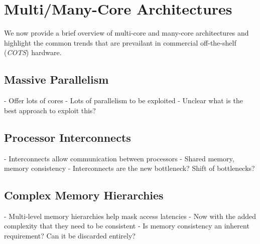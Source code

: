 \section{Multi/Many-Core Architectures}
\label{sec:overview}

We now provide a brief overview of multi-core and many-core architectures and
highlight the common trends that are prevailant in commercial off-the-shelf
(\emph{COTS}) hardware.

\subsection{Massive Parallelism}

- Offer lots of cores
- Lots of parallelism to be exploited
- Unclear what is the best approach to exploit this?

\subsection{Processor Interconnects}

- Interconnects allow communication between processors
- Shared memory, memory consistency
- Interconnects are the new bottleneck? Shift of bottlenecks?

\subsection{Complex Memory Hierarchies}

- Multi-level memory hierarchies help mask access latencies
- Now with the added complexity that they need to be consistent
- Is memory consistency an inherent requirement? Can it be discarded entirely?
